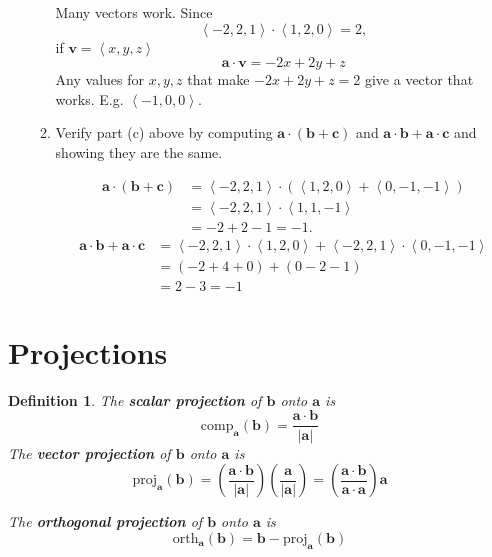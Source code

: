 \documentclass[12pt]{exam}
\newcommand{\gen}[1]{\left\langle #1 \right\rangle}
\newcommand{\ba}{\bm{a}}
\newcommand{\bb}{\bm{b}}
\newcommand{\bc}{\bm{c}}
\newtheorem*{definition}{Definition}
\begin{document}
\begin{enumerate}
\begin{enumerate}
          \begin{solution}
            Many vectors work. Since
            \[
              \gen{-2,2,1}\cdot\gen{1,2,0}=2,
            \]
            if \(\bm{v}=\gen{x,y,z}\) 
            \[
              \ba\cdot\bm{v}=-2x+2y+z
            \]
            Any values for \(x,y,z\) that make \(-2x+2y+z=2\) give a vector that works. E.g. \(\gen{-1,0,0}\).
          \end{solution}
        \item Verify part (c) above by computing \(\ba\cdot(\bb+\bc)\) and \(\ba\cdot\bb+\ba\cdot\bc\) and showing they are the same.

          \begin{solution}
            \begin{align*}
            \ba\cdot(\bb+\bc) & = \gen{-2,2,1}\cdot(\gen{1,2,0}+\gen{0,-1,-1})\\
                            & = \gen{-2,2,1}\cdot\gen{1,1,-1}\\
                            & = -2+2-1 = -1.
            \end{align*}
            \begin{align*}
              \ba\cdot\bb+\ba\cdot\bc & = \gen{-2,2,1}\cdot\gen{1,2,0}+\gen{-2,2,1}\cdot\gen{0,-1,-1}\\
              & = (-2+4+0)+(0-2-1)\\
              & = 2-3 = -1
            \end{align*}
          \end{solution}
    \end{enumerate}
\end{enumerate}


\newpage

\section*{Projections}

\begin{definition}
  The \textbf{scalar projection} of \(\bm{b}\) onto \(\bm{a}\) is
  \[
    \mathrm{comp}_{\ba}(\bb) = \dfrac{\ba\cdot\bb}{|\ba|}
  \]
  The \textbf{vector projection} of \(\bm{b}\) onto \(\bm{a}\) is
  \[
    \mathrm{proj}_{\ba}(\bb) = \left(\dfrac{\ba\cdot\bb}{|\ba|}\right) \left(\dfrac{\ba}{|\ba|}\right) = \left(\dfrac{\ba\cdot\bb}{\ba\cdot\ba}\right)\ba
  \]

  The \textbf{orthogonal projection} of \(\bm{b}\) onto \(\bm{a}\) is
  \[
    \mathrm{orth}_{\ba}(\bb) = \bb-\mathrm{proj}_{\ba}(\bb)
  \]
\end{definition}
\end{document}
